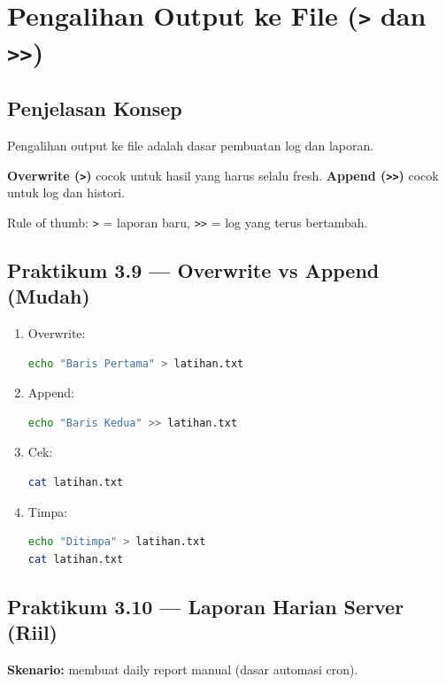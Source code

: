 \section{Pengalihan Output ke File (\texttt{>} dan \texttt{>>})}
\label{sec:redirect-to-file}

\subsection*{Penjelasan Konsep}
Pengalihan output ke file adalah dasar pembuatan log dan laporan.

\textbf{Overwrite (\texttt{>})} cocok untuk hasil yang harus selalu fresh.
\textbf{Append (\texttt{>>})} cocok untuk log dan histori.

\begin{tipbox}
Rule of thumb:
\texttt{>} = laporan baru,
\texttt{>>} = log yang terus bertambah.
\end{tipbox}

\subsection*{Praktikum 3.9 --- Overwrite vs Append (Mudah)}
\begin{enumerate}
    \item Overwrite:
\begin{lstlisting}[language=bash, caption={Overwrite}]
echo "Baris Pertama" > latihan.txt
\end{lstlisting}

    \item Append:
\begin{lstlisting}[language=bash, caption={Append}]
echo "Baris Kedua" >> latihan.txt
\end{lstlisting}

    \item Cek:
\begin{lstlisting}[language=bash, caption={Cek isi}]
cat latihan.txt
\end{lstlisting}

    \item Timpa:
\begin{lstlisting}[language=bash, caption={Timpa}]
echo "Ditimpa" > latihan.txt
cat latihan.txt
\end{lstlisting}
\end{enumerate}

\subsection*{Praktikum 3.10 --- Laporan Harian Server (Riil)}
\textbf{Skenario:} membuat daily report manual (dasar automasi cron).

